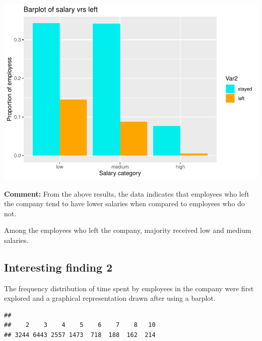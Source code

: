 \documentclass[
  11pt,
]{article}
\newenvironment{Shaded}{\begin{snugshade}}{\end{snugshade}}
\newcommand{\FunctionTok}[1]{\textcolor[rgb]{0.13,0.29,0.53}{\textbf{#1}}}
\newcommand{\NormalTok}[1]{#1}
\newcommand{\SpecialCharTok}[1]{\textcolor[rgb]{0.81,0.36,0.00}{\textbf{#1}}}
\begin{document}
\includegraphics[width=0.9\linewidth]{OWUSU_project_files/figure-latex/unnamed-chunk-10-1}

\hfill\break
\textbf{Comment:} From the above results, the data indicates that
employees who left the company tend to have lower salaries when compared
to employees who do not.

Among the employees who left the company, majority received low and
medium salaries.

\hfill\break

\subsection{Interesting finding 2}

The frequency distribution of time spent by employees in the company
were first explored and a graphical representation drawn after using a
barplot.

\begin{Shaded}
\end{Shaded}

\begin{verbatim}
## 
##    2    3    4    5    6    7    8   10 
## 3244 6443 2557 1473  718  188  162  214
\end{verbatim}
\end{document}
